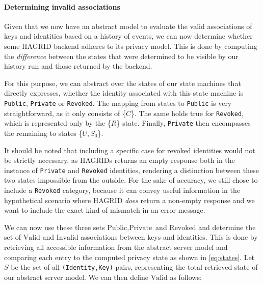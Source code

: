 \paragraph{Determining invalid associations}
Given that we now have an abstract model to evaluate the valid associations of keys and identities based on a history of events, we can now determine whether some HAGRID backend adheres to its privacy model. This is done by computing the \emph{difference} between the states that were determined to be visible by our history run and those returned by the backend.

For this purpose, we can abstract over the states of our state machines that directly expresses, whether the identity associated with this state machine is \texttt{Public}, \texttt{Private} or \texttt{Revoked}. The mapping from states to \texttt{Public} is very straightforward, as it only consists of \{\(C\)\}. The same holds true for \texttt{Revoked}, which is represented only by the \{\(R\)\} state. Finally, \texttt{Private} then encompasses the remaining to states \{\(U,S_0\)\}.

It should be noted that including a specific case for revoked identities would not be strictly necessary, as HAGRIDs returns an empty response both in the instance of \texttt{Private} and \texttt{Revoked} identities, rendering a distinction between these two states impossible from the outside. For the sake of accuracy, we still chose to include a \texttt{Revoked} category, because it can convey useful information in the hypothetical scenario where HAGRID \emph{does} return a non-empty response and we want to include the exact kind of mismatch in an error message.

We can now use these three sets \(\text{Public},\text{Private}\) and \(\text{Revoked}\) and determine the set of \(\text{Valid}\) and \(\text{Invalid}\) associations between keys and identities. This is done by retrieving all accessible information from the abstract server model and comparing each entry to the computed privacy state as shown in \ref{eq:states}. Let \(S\) be the set of all \texttt{(Identity,Key)} pairs, representing the total retrieved state of our abstract server model. We can then define \(\text{Valid}\) as follows:  

